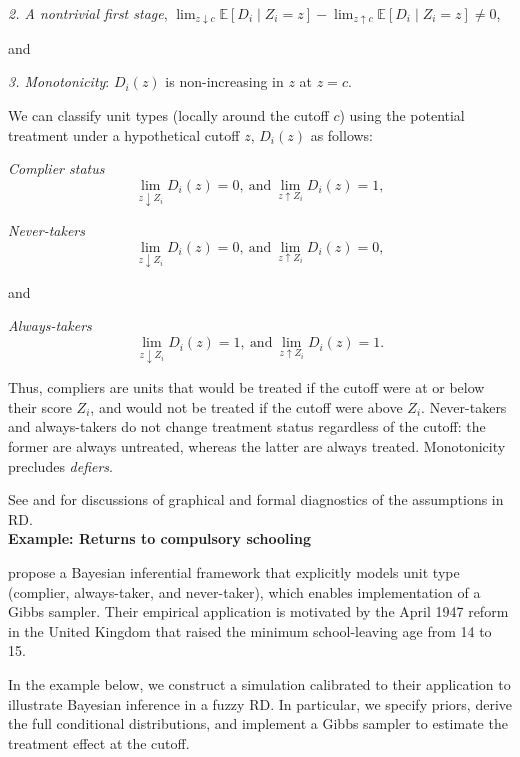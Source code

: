 \textit{2. A nontrivial first stage},
\(\lim_{z \downarrow c}\mathbb{E}[D_i\mid Z_i=z]-\lim_{z \uparrow c}\mathbb{E}[D_i\mid Z_i=z]\neq 0\),

and 

\textit{3. Monotonicity}: \(D_i(z)\) is non-increasing in \(z\) at \(z=c\).

We can classify unit types (locally around the cutoff $c$) using the potential treatment under a hypothetical cutoff $z$, $D_i(z)$ as follows:

\textit{Complier status} \[ \lim_{z\downarrow Z_i}D_i(z)=0, \ \text{and} \ \lim_{z\uparrow Z_i}D_i(z)=1, \]
 
\textit{Never-takers} \[ \lim_{z\downarrow Z_i}D_i(z)=0, \ \text{and} \ \lim_{z\uparrow Z_i}D_i(z)=0, \] 

and
 
\textit{Always-takers} \[ \lim_{z\downarrow Z_i}D_i(z)=1, \ \text{and} \ \lim_{z\uparrow Z_i}D_i(z)=1. \]

Thus, compliers are units that would be treated if the cutoff were at or below their score $Z_i$, and would not be treated if the cutoff were above $Z_i$. Never-takers and always-takers do not change treatment status regardless of the cutoff: the former are always untreated, whereas the latter are always treated. Monotonicity precludes \emph{defiers}.

See \cite{imbens2008regression} and \cite{cattaneo2019practical} for discussions of graphical and formal diagnostics of the assumptions in RD.\\

\textbf{Example: Returns to compulsory schooling \cite{chib2016bayesian}}

\cite{chib2016bayesian} propose a Bayesian inferential framework that explicitly models unit type (complier, always-taker, and never-taker), which enables implementation of a Gibbs sampler. Their empirical application is motivated by the April 1947 reform in the United Kingdom that raised the minimum school-leaving age from 14 to 15.

In the example below, we construct a simulation calibrated to their application to illustrate Bayesian inference in a fuzzy RD. In particular, we specify priors, derive the full conditional distributions, and implement a Gibbs sampler to estimate the treatment effect at the cutoff.

